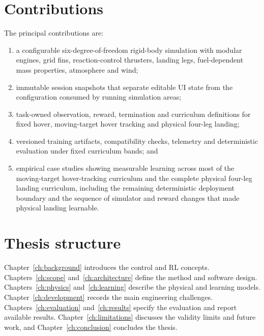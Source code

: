 \section{Contributions}

The principal contributions are:

\begin{enumerate}
	\item a configurable six-degree-of-freedom rigid-body simulation with modular engines, grid
	fins, reaction-control thrusters, landing legs, fuel-dependent mass properties, atmosphere
	and wind;
	\item immutable session snapshots that separate editable UI state from the configuration
	consumed by running simulation areas;
	\item task-owned observation, reward, termination and curriculum definitions for fixed hover,
	moving-target hover tracking and physical four-leg landing;
	\item versioned training artifacts, compatibility checks, telemetry and deterministic
	evaluation under fixed curriculum bands; and
	\item empirical case studies showing measurable learning across most of the moving-target
	hover-tracking curriculum and the complete physical four-leg landing curriculum, including
	the remaining deterministic deployment boundary and the sequence of simulator and reward
	changes that made physical landing learnable.
\end{enumerate}

\section{Thesis structure}

Chapter~\ref{ch:background} introduces the control and RL concepts. Chapters~\ref{ch:scope}
and~\ref{ch:architecture} define the method and software design. Chapters~\ref{ch:physics}
and~\ref{ch:learning} describe the physical and learning models. Chapter~\ref{ch:development}
records the main engineering challenges. Chapters~\ref{ch:evaluation} and~\ref{ch:results}
specify the evaluation and report available results. Chapter~\ref{ch:limitations} discusses the
validity limits and future work, and Chapter~\ref{ch:conclusion} concludes the thesis.